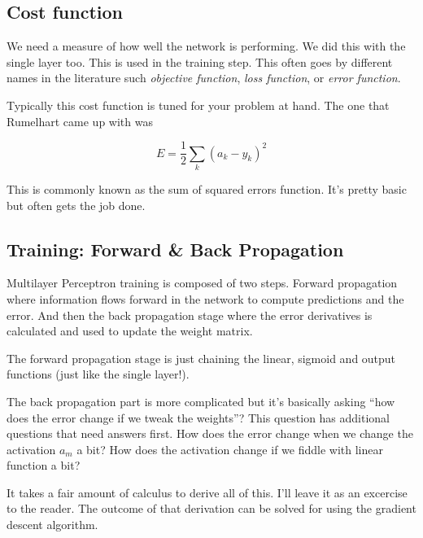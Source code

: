 \documentclass[letterpaper,12pt]{article}
\begin{document}
\subsection{Cost function}

We need a measure of how well the network is performing. We did this with the
single layer too. This is used in the training step. This often goes by
different names in the literature such \emph{objective function}, \emph{loss
function}, or \emph{error function}.

Typically this cost function is tuned for your problem at hand. The one that
Rumelhart came up with was

\[
    E = \frac{1}{2} \sum_{k} {(a_k - y_k)}^2
\]

This is commonly known as the sum of squared errors function. It's pretty basic
but often gets the job done.

\subsection{Training: Forward \& Back Propagation}

Multilayer Perceptron training is composed of two steps. Forward propagation
where information flows forward in the network to compute predictions and the
error. And then the back propagation stage where the error derivatives is
calculated and used to update the weight matrix.

The forward propagation stage is just chaining the linear, sigmoid and output
functions (just like the single layer!).

The back propagation part is more complicated but it's basically asking ``how
does the error change if we tweak the weights''? This question has additional
questions that need answers first. How does the error change when we change
the activation $a_m$ a bit?  How does the activation change if we fiddle with
linear function a bit?

It takes a fair amount of calculus to derive all of this. I'll leave it as an
excercise to the reader. The outcome of that derivation can be solved for using
the gradient descent algorithm.
\end{document}
